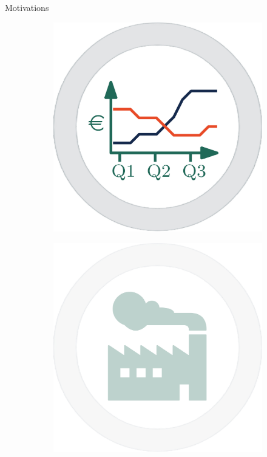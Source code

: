 \documentclass[16pt,usenames,dvipsnames, notheorems]{beamer}
\theoremstyle{definition}
\theoremstyle{example}
\theoremstyle{plain}
\begin{document}
\begin{frame}{Motivations}
\begin{figure}
\begin{subfigure}[c]{0.25\linewidth}
\begin{overprint}
			 \includegraphics[width=\linewidth]{figures/picture_finance.jpg}
		\end{overprint}
	\end{subfigure}
	\hspace{5mm}
	\begin{subfigure}[c]{0.25\linewidth}
		\centering
		\begin{overprint}
			 \includegraphics[width=\linewidth]{figures/picture_manufactoring_t.jpg}

\end{overprint}
\end{subfigure}
\end{figure}
\end{frame}
\end{document}
